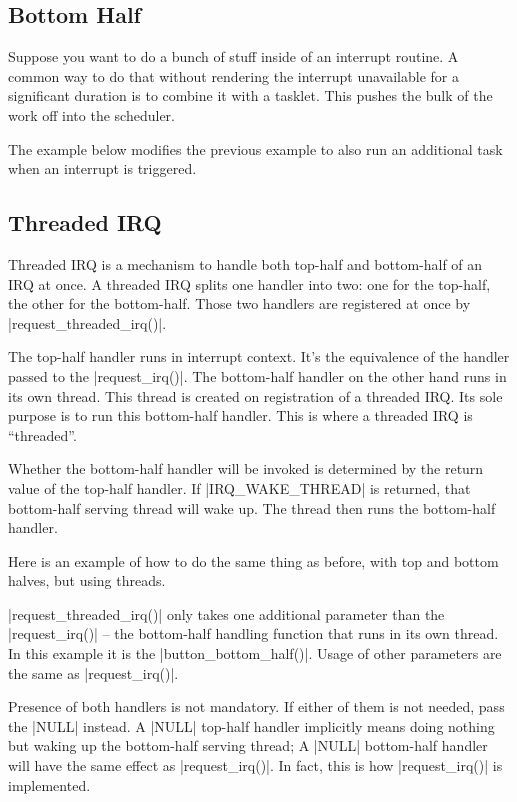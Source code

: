 \documentclass[10pt, oneside]{book}
\begin{document}

\subsection{Bottom Half}
\label{sec:bottom_half}
Suppose you want to do a bunch of stuff inside of an interrupt routine.
A common way to do that without rendering the interrupt unavailable for a significant duration is to combine it with a tasklet.
This pushes the bulk of the work off into the scheduler.

The example below modifies the previous example to also run an additional task when an interrupt is triggered.


\subsection{Threaded IRQ}

Threaded IRQ is a mechanism to handle both top-half and bottom-half of an IRQ at once.
A threaded IRQ splits one handler into two: one for the top-half, the other for the bottom-half.
Those two handlers are registered at once by \cpp|request_threaded_irq()|.

The top-half handler runs in interrupt context.
It's the equivalence of the handler passed to the \cpp|request_irq()|.
The bottom-half handler on the other hand runs in its own thread.
This thread is created on registration of a threaded IRQ. Its sole purpose is to run this bottom-half handler.
This is where a threaded IRQ is ``threaded''.

Whether the bottom-half handler will be invoked is determined by the return value of the top-half handler.
If \cpp|IRQ_WAKE_THREAD| is returned, that bottom-half serving thread will wake up.
The thread then runs the bottom-half handler.

Here is an example of how to do the same thing as before, with top and bottom halves, but using threads.


\cpp|request_threaded_irq()| only takes one additional parameter than the \cpp|request_irq()| -- the bottom-half handling function that runs in its own thread.
In this example it is the \cpp|button_bottom_half()|.
Usage of other parameters are the same as \cpp|request_irq()|.

Presence of both handlers is not mandatory.
If either of them is not needed, pass the \cpp|NULL| instead.
A \cpp|NULL| top-half handler implicitly means doing nothing but waking up the bottom-half serving thread; A \cpp|NULL| bottom-half handler will have the same effect as \cpp|request_irq()|.
In fact, this is how \cpp|request_irq()| is implemented.
\end{document}
